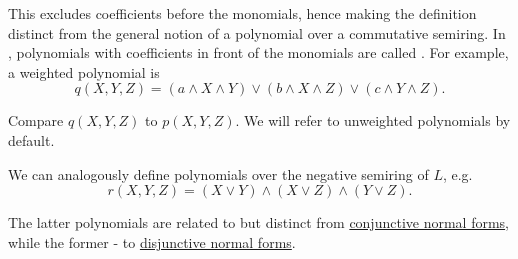 \begin{remark}
  This excludes coefficients before the monomials, hence making the definition distinct from the general notion of a polynomial over a commutative semiring. In \cite{Marichal2007}, polynomials with coefficients in front of the monomials are called . For example, a weighted polynomial is
  \begin{equation*}
    q(X, Y, Z) = (a \wedge X \wedge Y) \vee (b \wedge X \wedge Z) \vee (c \wedge Y \wedge Z).
  \end{equation*}

  Compare \( q(X, Y, Z) \) to \( p(X, Y, Z) \). We will refer to unweighted polynomials by default.

  We can analogously define polynomials over the negative semiring of \( L \), e.g.
  \begin{equation*}
    r(X, Y, Z) = (X \vee Y) \wedge (X \vee Z) \wedge (Y \vee Z).
  \end{equation*}

  The latter polynomials are related to but distinct from \hyperref[def:cnf_and_dnf]{conjunctive normal forms}, while the former - to \hyperref[def:cnf_and_dnf]{disjunctive normal forms}.
\end{remark}


